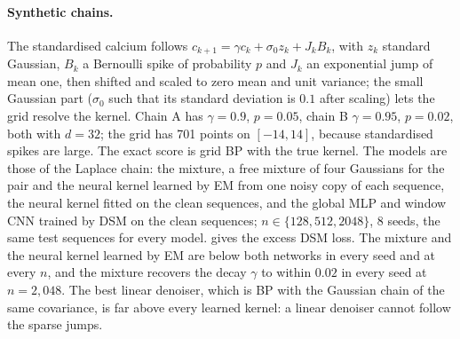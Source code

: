 \documentclass{article}
\begin{document}
\paragraph{Synthetic chains.} The standardised calcium follows $c_{k+1}=\gamma c_k+\sigma_0z_k+J_kB_k$, with $z_k$
standard Gaussian, $B_k$ a Bernoulli spike of probability $p$ and $J_k$ an exponential jump of mean one, then shifted and
scaled to zero mean and unit variance; the small Gaussian part ($\sigma_0$ such that its standard deviation is $0.1$
after scaling) lets the grid resolve the kernel. Chain A has $\gamma=0.9$, $p=0.05$, chain B $\gamma=0.95$, $p=0.02$,
both with $d=32$; the grid has 701 points on $[-14,14]$, because standardised spikes are large. The exact score is
grid BP with the true kernel. The models are those of the Laplace chain: the mixture, a free mixture of four Gaussians
for the pair and the neural kernel learned by EM from one noisy copy of each sequence, the neural kernel fitted on the
clean sequences, and the global MLP and window CNN trained by DSM on the clean sequences; $n\in\{128,512,2048\}$,
8 seeds, the same test sequences for every model.  gives the excess DSM loss. The mixture and
the neural kernel learned by EM are below both networks in every seed and at every $n$, and the mixture recovers the
decay $\gamma$ to within $0.02$ in every seed at $n=2{,}048$. The best linear denoiser, which is BP with the Gaussian
chain of the same covariance, is far above every learned kernel: a linear denoiser cannot follow the sparse jumps.

\begin{table}[!htbp]
  \caption{Synthetic calcium chains A ($\gamma=0.9$, $p=0.05$) and B ($\gamma=0.95$, $p=0.02$): excess DSM loss
  ($\times10^{-3}$), medians over 8 seeds, the same seeds, training sequences and test sequences for every model. EM: from one noisy copy of each sequence; clean: maximum likelihood on
  the clean sequences; networks: DSM on the clean sequences. Last row: the Bayes loss itself.}
  \label{tab:calcium-synth}
  \centering
  \small
  
\end{table}
\end{document}
